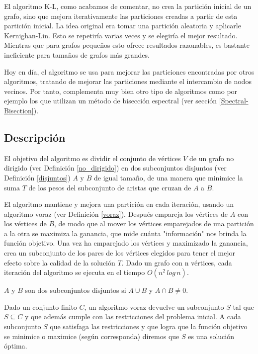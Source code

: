 El algoritmo K-L, como acabamos de comentar, no crea la partición inicial de un grafo, sino que mejora iterativamente las particiones creadas a partir de esta partición inicial. La idea original era tomar una partición aleatoria y aplicarle Kernighan-Lin\cite{KernighanLin}. Esto se repetiría varias veces y se elegiría el mejor resultado. Mientras que para grafos pequeños esto ofrece resultados razonables, es bastante ineficiente para tamaños de grafos más grandes.

Hoy en día, el algoritmo se usa para mejorar las particiones encontradas por otros algoritmos, tratando de mejorar las particiones mediante el intercambio de nodos vecinos. Por tanto, complementa muy bien otro tipo de algoritmos como por ejemplo los que utilizan un método de bisección espectral (ver sección \ref{Spectral-Bisection}).

\subsection{Descripción}

El objetivo del algoritmo es dividir el conjunto de vértices $V$ de un grafo no dirigido (ver Definición \ref{no_dirigido}) en dos subconjuntos disjuntos (ver Definición \ref{disjuntos}) $A$ y $B$ de igual tamaño, de una manera que minimice la suma $T$ de los pesos del subconjunto de aristas que cruzan de $A$ a $B$. 

El algoritmo mantiene y mejora una partición en cada iteración, usando un algoritmo voraz (ver Definición \ref{voraz}). Después empareja los vértices de $A$ con los vértices de $B$, de modo que al mover los vértices emparejados de una partición a la otra se maximiza la ganancia, que mide cuánta "información" nos brinda la función objetivo. Una vez ha emparejado los vértices y maximizado la ganancia, crea un subconjunto de los pares de los vértices elegidos para tener el mejor efecto sobre la calidad de la solución $T$. Dado un grafo con n vértices, cada iteración del algoritmo se ejecuta en el tiempo $O({n}^2 \, log \, n)$.

\begin{mydef}\label{disjuntos}
	$A$ y $B$ son dos subconjuntos disjuntos si $A \cup B$ y $A \cap B \neq 0$.
\end{mydef}

\begin{mydef}\label{voraz}
	Dado un conjunto finito $C$, un algoritmo voraz devuelve un subconjunto $S$ tal que $S\subseteq C$ y que además cumple con las restricciones del problema inicial. A cada subconjunto $S$ que satisfaga las restricciones y que logra que la función objetivo se minimice o maximice (según corresponda) diremos que $S$ es una solución óptima. 
\end{mydef}

